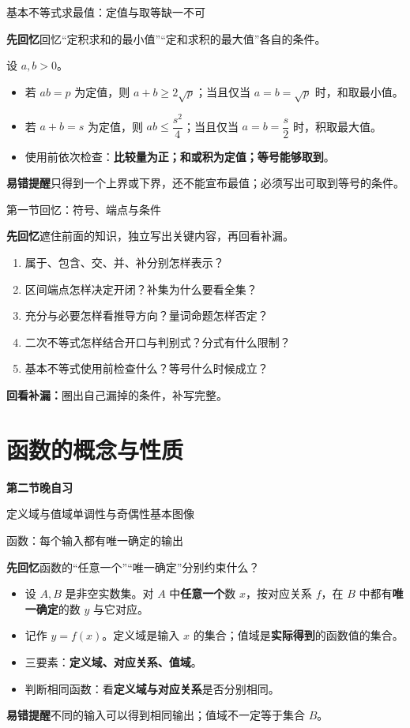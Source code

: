 \documentclass[UTF8,10pt,aspectratio=169]{ctexbeamer}
\newcommand{\Recall}[1]{\par\noindent\textcolor{KnowledgeBlue}{\textbf{先回忆}\quad #1}\par\vspace{0.3cm}}
\newcommand{\Pitfall}[1]{\par\vspace{0.22cm}\noindent\textbf{易错提醒}\quad #1\par}
\newcommand{\Session}[3]{\section{#2}\begin{frame}\vspace{0.7cm}\begin{center}{\Large\bfseries 第#1节晚自习}\par\vspace{0.5cm}{\LARGE\bfseries #2}\par\vspace{0.6cm}#3\end{center}\end{frame}}
\begin{document}
\begin{frame}[t]{基本不等式求最值：定值与取等缺一不可}
\large
\Recall{回忆“定积求和的最小值”“定和求积的最大值”各自的条件。}
\pause
设 $a,b>0$。
\begin{itemize}
  \item 若 $ab=p$ 为定值，则 $a+b\ge2\sqrt p$；当且仅当 $a=b=\sqrt p$ 时，和取最小值。
  \item 若 $a+b=s$ 为定值，则 $ab\le\dfrac{s^2}{4}$；当且仅当 $a=b=\dfrac{s}{2}$ 时，积取最大值。
  \item 使用前依次检查：\textbf{比较量为正；和或积为定值；等号能够取到}。
\end{itemize}
\Pitfall{只得到一个上界或下界，还不能宣布最值；必须写出可取到等号的条件。}
\end{frame}


\begin{frame}[t]{第一节回忆：符号、端点与条件}
\Recall{遮住前面的知识，独立写出关键内容，再回看补漏。}
\begin{enumerate}
\item 属于、包含、交、并、补分别怎样表示？
\item 区间端点怎样决定开闭？补集为什么要看全集？
\item 充分与必要怎样看推导方向？量词命题怎样否定？
\item 二次不等式怎样结合开口与判别式？分式有什么限制？
\item 基本不等式使用前检查什么？等号什么时候成立？
\end{enumerate}
\pause
\par\vspace{0.2cm}\textbf{回看补漏：}圈出自己漏掉的条件，补写完整。
\end{frame}

\Session{二}{函数的概念与性质}{定义域与值域\quad 单调性与奇偶性\quad 基本图像}


\begin{frame}[t]{函数：每个输入都有唯一确定的输出}
\large
\Recall{函数的“任意一个”“唯一确定”分别约束什么？}
\pause
\begin{itemize}
  \item 设 $A,B$ 是非空实数集。对 $A$ 中\textbf{任意一个}数 $x$，按对应关系 $f$，在 $B$ 中都有\textbf{唯一确定}的数 $y$ 与它对应。
  \item 记作 $y=f(x)$。定义域是输入 $x$ 的集合；值域是\textbf{实际得到}的函数值的集合。
  \item 三要素：\textbf{定义域、对应关系、值域}。
  \item 判断相同函数：看\textbf{定义域与对应关系}是否分别相同。
\end{itemize}
\Pitfall{不同的输入可以得到相同输出；值域不一定等于集合 $B$。}
\end{frame}
\end{document}
